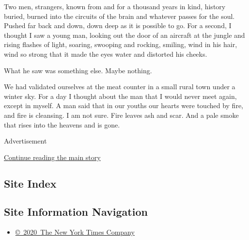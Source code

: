 Two men, strangers, known from and for a thousand years in kind, history
buried, burned into the circuits of the brain and whatever passes for
the soul. Pushed far back and down, down deep as it is possible to go.
For a second, I thought I saw a young man, looking out the door of an
aircraft at the jungle and rising flashes of light, soaring, swooping
and rocking, smiling, wind in his hair, wind so strong that it made the
eyes water and distorted his cheeks.

What he saw was something else. Maybe nothing.

We had validated ourselves at the meat counter in a small rural town
under a winter sky. For a day I thought about the man that I would never
meet again, except in myself. A man said that in our youths our hearts
were touched by fire, and fire is cleansing. I am not sure. Fire leaves
ash and scar. And a pale smoke that rises into the heavens and is gone.

Advertisement

\protect\hyperlink{after-bottom}{Continue reading the main story}

\hypertarget{site-index}{%
\subsection{Site Index}\label{site-index}}

\hypertarget{site-information-navigation}{%
\subsection{Site Information
Navigation}\label{site-information-navigation}}

\begin{itemize}
\tightlist
\item
  \href{https://help.nytimes.com/hc/en-us/articles/115014792127-Copyright-notice}{©~2020~The
  New York Times Company}
\end{itemize}


